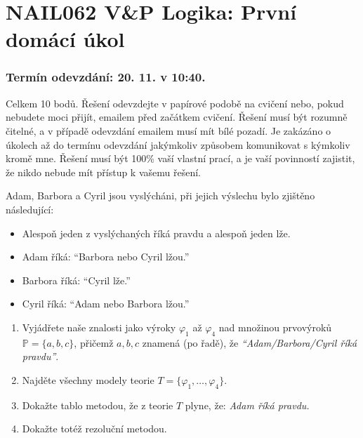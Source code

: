 \documentclass[a4paper,12pt]{article}
\begin{document}
\section*{NAIL062 V\&P Logika: První domácí  úkol}

\subsubsection*{Termín odevzdání: 20. 11. v 10:40.}
Celkem 10 bodů. Řešení odevzdejte v papírové podobě na cvičení nebo, pokud nebudete moci přijít, emailem před začátkem cvičení. Řešení musí být rozumně čitelné, a v případě odevzdání emailem musí mít bílé pozadí. Je zakázáno o úkolech až do termínu odevzdání jakýmkoliv způsobem komunikovat s kýmkoliv kromě mne. Řešení musí být 100\% vaší vlastní prací, a je vaší povinností zajistit, že nikdo nebude mít přístup k vašemu řešení.

\medskip\begin{problem}[4 body]
    Adam, Barbora a Cyril jsou vyslýcháni, při jejich výslechu bylo zjištěno následující:
    \begin{itemize}\it
        \item Alespoň jeden z vyslýchaných říká pravdu a alespoň jeden lže.
        \item Adam říká: ``Barbora nebo Cyril lžou.''
        \item Barbora říká: ``Cyril lže.''
        \item Cyril říká: ``Adam nebo Barbora lžou.''
    \end{itemize}
    \begin{enumerate}
        \item Vyjádřete naše znalosti jako výroky $\varphi_1$ až $\varphi_4$ nad množinou prvovýroků $\mathbb{P}=\{a,b,c\}$, přičemž $a,b,c$ znamená (po řadě), že {\it ``Adam/Barbora/Cyril říká pravdu''}.
        \item Najděte všechny modely teorie $T = \{\varphi_1, \dots, \varphi_4\}$.
        \item Dokažte tablo metodou, že z teorie $T$ plyne, že: {\it Adam říká pravdu.}
        \item Dokažte totéž rezoluční metodou.
    \end{enumerate}
\end{problem}
\end{document}
